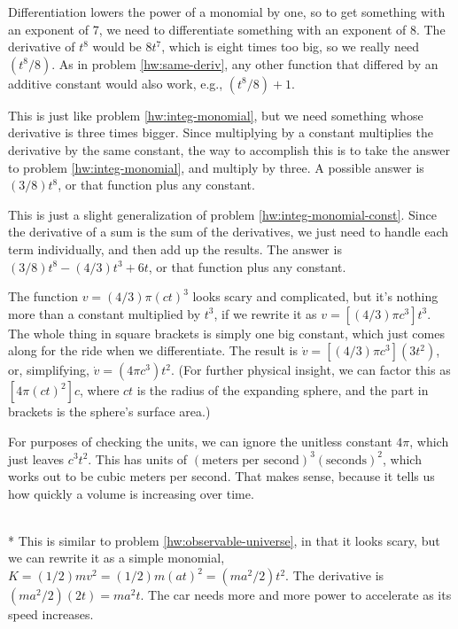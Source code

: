 
Differentiation lowers the power of a monomial by one, so to get something with an exponent
of 7, we need to differentiate something with an exponent of 8. The derivative of
$t^8$ would be $8t^7$, which is eight times too big, so we really need $(t^8/8)$.
As in problem \ref{hw:same-deriv}, any other function that differed by an additive constant
would also work, e.g., $(t^8/8)+1$.


This is just like problem \ref{hw:integ-monomial}, but we need something whose derivative
is three times bigger. Since multiplying by a constant multiplies the derivative by the
same constant, the way to accomplish this is to take the answer to problem \ref{hw:integ-monomial},
and multiply by three. A possible answer is $(3/8)t^8$, or that function plus any constant.


This is just a slight generalization of problem \ref{hw:integ-monomial-const}. Since
the derivative of a sum is the sum of the derivatives, we just need to handle each term
individually, and then add up the results. The answer is
$(3/8)t^8-(4/3)t^3+6t$, or that function plus any constant.


The function $v=(4/3)\pi(ct)^3$ looks scary and complicated, but it's nothing more than a constant
multiplied by $t^3$, if we rewrite it as $v=\left[(4/3)\pi c^3\right]t^3$. The whole thing
in square brackets is simply one big constant, which just comes along for the ride
when we differentiate. The result is $\dot{v}=\left[(4/3)\pi c^3\right](3t^2)$, or,
simplifying, $\dot{v}=\left(4\pi c^3\right)t^2$. (For further physical insight, we can
factor this as $\left[4\pi (ct)^2\right]c$, where $ct$ is the radius of the expanding sphere, and
the part in brackets is the sphere's surface area.)

For purposes of checking the units, we can ignore the unitless constant $4\pi$, which just
leaves $c^3t^2$. This has units of $(\text{meters per second})^3(\text{seconds})^2$, which
works out to be cubic meters per second. That makes sense, because it tells us how quickly
a volume is increasing over time.

\\*
This is similar to problem \ref{hw:observable-universe}, in that it looks scary, but we can rewrite
it as a simple monomial, $K=(1/2)mv^2=(1/2)m(at)^2=(ma^2/2)t^2$. The derivative is
$(ma^2/2)(2t)=ma^2t$. The car needs more and more power to accelerate as its speed increases.

